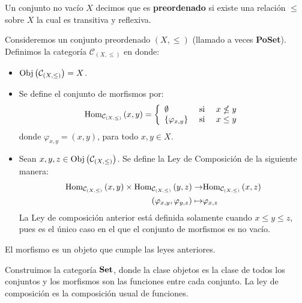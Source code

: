\documentclass{article}
\newcounter{it}
\theoremstyle{largebreak}
\newcommand{\Obj}[1]{\ensuremath{\textup{Obj}\left(#1\right)}}
\newcommand{\Hom}[3]{\ensuremath{\textup{Hom}_{#1}\left(#2,#3\right)}}
\newcommand{\Cat}[1]{\ensuremath{\textup{\textbf{#1}}}}
\begin{document}
    \begin{mydef}
        Un conjunto no vacío $X$ decimos que es \textbf{preordenado} si existe una relación $\leq$ sobre $X$ la cual es transitiva y reflexiva.
    \end{mydef}

    \begin{exa}
        Consideremos un conjunto preordenado $(X,\leq)$ (llamado a veces \textbf{PoSet}). Definimos la categoría $\mathcal{C}_{(X,\leq)}$ en donde:
        \begin{itemize}
            \item $\Obj{\mathcal{C}_{(X,\leq)}}=X$.
            \item Se define el conjunto de morfismos por:
            \begin{equation*}
                \Hom{\mathcal{C}_{(X,\leq)}}{x}{y}=\left\{
                    \begin{array}{lcr}
                        \emptyset & \textup{ si } & x\nleq y\\
                        \left\{\varphi_{x,y} \right\} & \textup{ si } & x\leq y\\
                    \end{array}
                \right.
            \end{equation*}
            donde $\varphi_{x,y}=(x,y)$, para todo $x,y\in X$.
            \item Sean $x,y,z\in \Obj{\mathcal{C}_{(X,\leq)}}$. Se define la Ley de Composición de la siguiente manera:
            \begin{equation*}
                \begin{split}
                    \Hom{\mathcal{C}_{(X,\leq)}}{x}{y}\times\Hom{\mathcal{C}_{(X,\leq)}}{y}{z}\rightarrow&\Hom{\mathcal{C}_{(X,\leq)}}{x}{z}\\
                    (\varphi_{x,y},\varphi_{y,z})\mapsto&\varphi_{x,z}\\
                \end{split}
            \end{equation*}
            La Ley de composición anterior está definida solamente cuando $x\leq y\leq z$, pues es el único caso en el que el conjunto de morfismos es no vacío.
        \end{itemize}

        El morfismo es un objeto que cumple las leyes anteriores.
    \end{exa}
    
    \begin{exa}
        Construimos la categoría $\Cat{Set}$, donde la clase objetos es la clase de todos los conjuntos y los morfismos son las funciones entre cada conjunto. La ley de composición es la composición usual de funciones.
    \end{exa}
\end{document}
